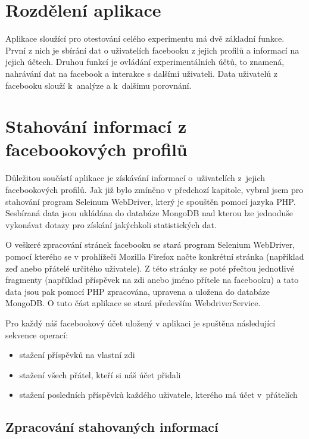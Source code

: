 \documentclass[thesis=M,czech]{FITthesis}[2013/05/10]
\begin{document}
\section{Rozdělení aplikace}

Aplikace sloužící pro otestování celého experimentu má dvě základní funkce. První z nich je sbírání dat o uživatelích facebooku z jejich profilů a informací na jejich účtech. Druhou funkcí je ovládání experimentálních účtů, to znamená, nahrávání dat na facebook a interakce s dalšími uživateli. Data uživatelů z facebooku slouží k~analýze a k~dalšímu porovnání.

\section{Stahování informací z facebookových profilů}

Důležitou součástí aplikace je získávání informací o~uživatelích z~jejich facebookových profilů. Jak již bylo zmíněno v předchozí kapitole, vybral jsem pro stahování program Seleinum WebDriver, který je spouštěn pomocí jazyka PHP. Sesbíraná data jsou ukládána do databáze MongoDB nad kterou lze jednoduše vykonávat dotazy pro získání jakýchkoli statistických dat.

O veškeré zpracování stránek facebooku se stará program Selenium WebDriver, pomocí kterého se v prohlížeči Mozilla Firefox načte konkrétní stránka (například zeď anebo přátelé určitého uživatele). Z této stránky se poté přečtou jednotlivé fragmenty (například příspěvek na zdi anebo jméno přítele na facebooku) a tato data jsou pak pomocí PHP zpracována, upravena a uložena do databáze MongoDB. O tuto část aplikace se stará především WebdriverService.

Pro každý náš facebookový účet uložený v aplikaci je spuštěna následující sekvence operací:

\begin{itemize}
  \item stažení příspěvků na vlastní zdi
  \item stažení všech přátel, kteří si náš účet přidali
  \item stažení posledních příspěvků každého uživatele, kterého má účet v~přátelích
\end{itemize}

\subsection{Zpracování stahovaných informací}
\end{document}
